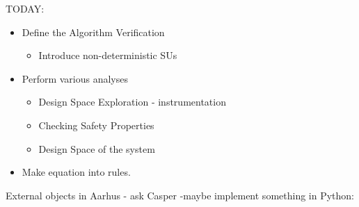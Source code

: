 \documentclass[runningheads]{llncs}
\begin{document}
TODAY:
\begin{itemize}
  \item Define the Algorithm Verification
  \begin{itemize}
    \item Introduce non-deterministic SUs
  \end{itemize}
  \item Perform various analyses
  \begin{itemize}
    \item Design Space Exploration - instrumentation
    \item Checking Safety Properties
    \item Design Space of the system
  \end{itemize}
  \item Make equation into rules.
\end{itemize}

External objects in Aarhus - ask Casper -maybe implement something in Python:




%

%

%

%

%

%

%
%




\end{document}
